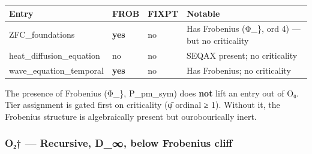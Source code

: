 {\def\LTcaptype{none} %
\begin{longtable}[]{@{}
  >{\raggedright\arraybackslash}p{}
  >{\raggedright\arraybackslash}p{}
  >{\raggedright\arraybackslash}p{}
  >{\raggedright\arraybackslash}p{}@{}}
\toprule\noalign{}
\begin{minipage}[b]{\linewidth}\raggedright
Entry
\end{minipage} & \begin{minipage}[b]{\linewidth}\raggedright
FROB
\end{minipage} & \begin{minipage}[b]{\linewidth}\raggedright
FIXPT
\end{minipage} & \begin{minipage}[b]{\linewidth}\raggedright
Notable
\end{minipage} \\
\midrule\noalign{}
\endhead
\bottomrule\noalign{}
\endlastfoot
ZFC\_foundations & \textbf{yes} & no & Has Frobenius (Φ\_\}, ord 4) ---
but no criticality \\
heat\_diffusion\_equation & no & no & SEQAX present; no criticality \\
wave\_equation\_temporal & \textbf{yes} & no & Has Frobenius; no
criticality \\
\end{longtable}
}

The presence of Frobenius (Φ\_\}, P\_pm\_sym) does \textbf{not} lift an
entry out of O₀. Tier assignment is gated first on criticality (φ̂
ordinal ≥ 1). Without it, the Frobenius structure is algebraically
present but ourobourically inert.

\subsubsection{O₂† --- Recursive, D\_∞, below Frobenius
cliff}\label{oux2082-recursive-d_-below-frobenius-cliff}

